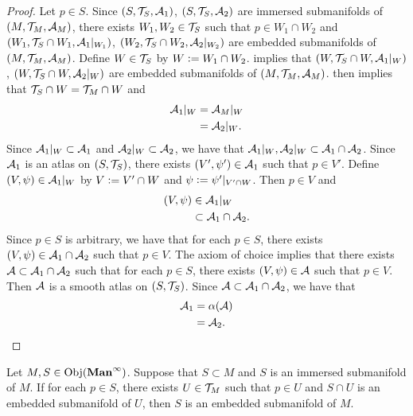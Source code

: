\documentclass{book}
\begin{document}
	\begin{proof}
		Let $p \in S$. Since $(S, \mathcal{T}_S, \mathcal{A}_1)$, $(S, \mathcal{T}_S, \mathcal{A}_2)$ are immersed submanifolds of $(M, \mathcal{T}_M, \mathcal{A}_M)$, there exists $W_1, W_2 \in \mathcal{T}_S$ such that $p \in W_1 \cap W_2$ and $(W_1, \mathcal{T}_S \cap W_1, \mathcal{A}_1|_{W_1})$, $(W_2, \mathcal{T}_S \cap W_2, \mathcal{A}_2|_{W_2})$ are embedded submanifolds of $(M, \mathcal{T}_M, \mathcal{A}_M)$. Define $W \in \mathcal{T}_S$ by $W \vcentcolon= W_1 \cap W_2$.   implies that $(W, \mathcal{T}_S \cap W, \mathcal{A}_1|_W)$, $(W, \mathcal{T}_S \cap W, \mathcal{A}_2|_W)$ are embedded submanifolds of $(M, \mathcal{T}_M, \mathcal{A}_M)$.  then implies that $\mathcal{T}_S \cap W = \mathcal{T}_M \cap W$ and 
		\begin{align*}
			\mathcal{A}_1|_W
			& = \mathcal{A}_M|_W \\
			& = \mathcal{A}_2|_W.
		\end{align*}
		Since $\mathcal{A}_1|_W \subset \mathcal{A}_1$ and $\mathcal{A}_2|_W \subset \mathcal{A}_2$, we have that $\mathcal{A}_1|_W, \mathcal{A}_2|_W \subset \mathcal{A}_1 \cap \mathcal{A}_2$. Since $\mathcal{A}_1$ is an atlas on $(S, \mathcal{T}_S)$, there exists $(V', \psi') \in \mathcal{A}_1$ such that $p \in V'$. Define $(V, \psi) \in \mathcal{A}_1|_W$ by $V \vcentcolon= V' \cap W$ and $\psi \vcentcolon= \psi'|_{V' \cap W}$. Then $p \in V$ and
		\begin{align*}
			(V, \psi) 
			& \in \mathcal{A}_1|_W \\
			& \subset \mathcal{A}_1 \cap \mathcal{A}_2.
		\end{align*}
		Since $p \in S$ is arbitrary, we have that for each $p \in S$, there exists $(V, \psi) \in \mathcal{A}_1 \cap \mathcal{A}_2$ such that $p \in V$. The axiom of choice implies that there exists $\mathcal{A} \subset \mathcal{A}_1 \cap \mathcal{A}_2$ such that for each $p \in S$, there exists $(V, \psi) \in \mathcal{A}$ such that $p \in V$. Then $\mathcal{A}$ is a smooth atlas on $(S, \mathcal{T}_S)$. Since $\mathcal{A} \subset \mathcal{A}_1 \cap \mathcal{A}_2$, we have that 
		\begin{align*}
			\mathcal{A}_1
			& = \alpha(\mathcal{A}) \\
			& = \mathcal{A}_2.
		\end{align*}
	\end{proof}

	\begin{ex} 
		Let $M, S \in \operatorname{Obj}(\operatorname*{\text{\textbf{Man}}^{\infty}})$. Suppose that $S \subset M$ and $S$ is an immersed submanifold of $M$. If for each $p \in S$, there exists $U \in \mathcal{T}_M$ such that $p \in U$ and $S \cap U$ is an embedded submanifold of $U$, then $S$ is an embedded submanifold of $M$. 
	\end{ex}
	
\end{document}
